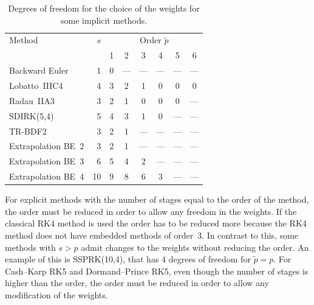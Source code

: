 \documentclass[a4paper]{article}
\numberwithin{equation}{section}
\theoremstyle{plain}
\theoremstyle{definition}
\numberwithin{theorem}{section}
\newcommand{\1}{\mathbbm{1}}
\newcommand{\pt}{{\tilde{p}}}
\begin{document}
\begin{table}[h!]
\centering   %
   \begin{tabular*}{\linewidth}{@{\extracolsep{\fill}}lr*6c@{}}
    \toprule
    Method & $s$ & \multicolumn{6}{c}{Order $\tilde p$} \\
    & & 1 & 2 & 3 & 4 & 5 & 6 \\
    \midrule
    Backward Euler& 1&0& --- & --- & --- & --- & ---  \\
    Lobatto~IIIC4 \cite{chipman1971stable} & 4&3&2&1&0&0&0 \\
    Radau~IIA3 \cite{ehle1969pade} & 3&2&1&0&0&0& ---  \\
    SDIRK(5,4) \cite[eq. (6.18)]{hairer_solving_1996}& 5&4&3&1&0& --- & ---  \\
    TR-BDF2 \cite{bank1985transient} & 3&2&1& --- & --- & --- & ---  \\
    Extrapolation BE~2 \cite[Sec.~II.9]{hairer_solving_1993} & 3&2&1& --- & --- & --- & ---  \\
    Extrapolation BE~3 \cite[Sec.~II.9]{hairer_solving_1993} & 6&5&4&2& --- & --- & ---  \\
    Extrapolation BE~4 \cite[Sec.~II.9]{hairer_solving_1993} & 10&9&8&6&3& --- & ---  \\
    \bottomrule
  \end{tabular*}
  \caption{Degrees of freedom for the choice of the weights for some implicit methods.} %
  \label{table:DOF_imp}
\end{table}

For explicit methods with the number of stages equal to the order of the
method, the order must be reduced in order to allow any freedom in the weights.
If the classical RK4 method is used the order has to be reduced more because
the RK4 method does not have embedded methods of order~3.
In contrast to this, some methods with $s > p$ admit changes to the weights without reducing the order.
An example of this is SSPRK(10,4), that has 4 degrees of freedom for $\pt = p$.
For Cash--Karp RK5 and Dormand--Prince RK5, even though the number of stages is higher than the order,
the order must be reduced in order to allow any modification of the weights.
\end{document}
